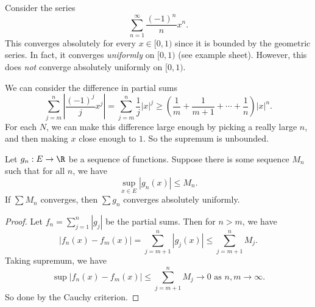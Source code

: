 \documentclass[a4paper]{article}
\begin{document}
\begin{eg}
  Consider the series
  \[
    \sum_{n = 1}^\infty \frac{(-1)^n}{n}x^n.
  \]
  This converges absolutely for every $x\in [0, 1)$ since it is bounded by the geometric series. In fact, it converges \emph{uniformly} on $[0, 1)$ (see example sheet). However, this does \emph{not} converge absolutely uniformly on $[0, 1)$.

  We can consider the difference in partial sums
  \[
    \sum_{j = m}^n \left|\frac{(-1)^j}{j}x^j\right| = \sum_{j = m}^n \frac{1}{j}|x|^j \geq \left(\frac{1}{m} + \frac{1}{m + 1} + \cdots + \frac{1}{n}\right)|x|^n.
  \]
  For each $N$, we can make this difference large enough by picking a really large $n$, and then making $x$ close enough to $1$. So the supremum is unbounded.
\end{eg}

\begin{thm}
  Let $g_n: E \to \R$ be a sequence of functions. Suppose there is some sequence $M_n$ such that for all $n$, we have
  \[
    \sup_{x\in E}|g_n (x)| \leq M_n.
  \]
  If $\sum M_n$ converges, then $\sum g_n$ converges absolutely uniformly.
\end{thm}

\begin{proof}
  Let $f_n = \sum\limits_{j = 1}^n |g_j|$ be the partial sums. Then for $n > m$, we have
  \[
    |f_n(x) - f_m(x)| = \sum_{j = m + 1}^n |g_j(x)| \leq \sum_{j = m + 1}^n M_j.
  \]
  Taking supremum, we have
  \[
    \sup|f_n(x) - f_m(x)| \leq \sum_{j = m + 1}^n M_j \to 0\text{ as }n, m\to \infty.
  \]
  So done by the Cauchy criterion.
\end{proof}
\end{document}
